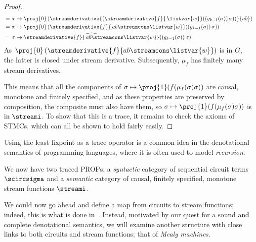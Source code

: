 \begin{proof}
\begin{align*}
            &= \sigma \mapsto \proj{0}\left(\streamderivative{\left(\streamderivative{f}{\, \listvar{w}}(\left(g_{k-1}(\sigma)\right)\sigma)\right)}{ab}\right) \\
            &= \sigma \mapsto \proj{0}\left(\streamderivative{f}{\, ab \streamcons \listvar{w}}(\left(g_{k-1}(\sigma)\right)\sigma)\right) \\
            &= \sigma \mapsto \widehat{\streamderivative{f}{\, ab \streamcons \listvar{w}}}(\left(g_{k-1}(\sigma)\right)\sigma)
        \end{align*}
    As \(\proj{0}\left(\streamderivative{f}{ab \streamcons \listvar{w}}\right)\)
    is in \(G\), the latter  is closed under stream derivative.
    Subsequently, \(\mu_f\) has finitely many stream derivatives.

    This means that all the components of
    \(\sigma \mapsto \proj{1}(f(\mu_f(\sigma)\sigma))\) are causal, monotone and
    finitely specified, and as these properties are preserved by composition,
    the composite must also have them, so
    \(\sigma \mapsto \proj{1}(f(\mu_f(\sigma)\sigma))\) is in \(\streami\).
    To show that this is a trace, it remains to check the axioms of STMCs,
    which can all be shown to hold fairly easily.
\end{proof}

\begin{remark}
    Using the least fixpoint as a trace operator is a common idea in the
    denotational semantics of programming languages, where it is often used to
    model \emph{recursion}.
\end{remark}

We now have two traced PROPs: a \emph{syntactic} category of sequential circuit
terms \(\scircsigma\) and a \emph{semantic} category of causal, finitely
specified, monotone stream functions \(\streami\).

We could now go ahead and define a map from circuits to stream functions;
indeed, this is what is done in~\cite{ghica2024fully}.
Instead, motivated by our quest for a sound and complete denotational semantics,
we will examine another structure with close links to both circuits and stream
functions; that of \emph{Mealy machines}.



